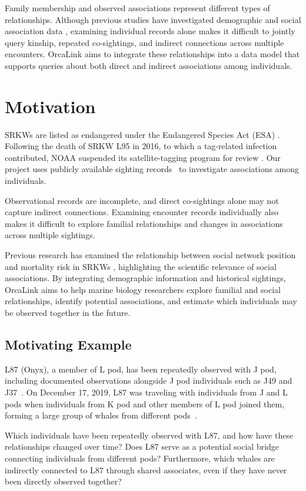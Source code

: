 \documentclass[sigconf]{acmart}
\begin{document}
Family membership and observed associations represent different types of relationships. Although previous studies have investigated demographic and social association data \cite{ellis2017}, examining individual records alone makes it difficult to jointly query kinship, repeated co-sightings, and indirect connections across multiple encounters. OrcaLink aims to integrate these relationships into a data model that supports queries about both direct and indirect associations among individuals.

\section{Motivation}

SRKWs are listed as endangered under the Endangered Species Act (ESA) \cite{epaSRKW}. Following the death of SRKW L95 in 2016, to which a tag-related infection contributed, NOAA suspended its satellite-tagging program for review \cite{noaaTagging}. Our project uses publicly available sighting records~\cite{thompson2026dryad} to investigate associations among individuals.

Observational records are incomplete, and direct co-sightings alone may not capture indirect connections. Examining encounter records individually also makes it difficult to explore familial relationships and changes in associations across multiple sightings.

Previous research has examined the relationship between social network position and mortality risk in SRKWs \cite{ellis2017}, highlighting the scientific relevance of social associations. By integrating demographic information and historical sightings, OrcaLink aims to help marine biology researchers explore familial and social relationships, identify potential associations, and estimate which individuals may be observed together in the future.

\subsection{Motivating Example}
L87 (Onyx), a member of L pod, has been repeatedly observed with J pod, including documented observations alongside J pod individuals such as J49 and J37~\cite{cwr2019mar22}. On December 17, 2019, L87 was traveling with individuals from J and L pods when individuals from K pod and other members of L pod joined them, forming a large group of whales from different pods~\cite{cwr2019dec17}.

Which individuals have been repeatedly observed with L87, and how have these relationships changed over time? Does L87 serve as a potential social bridge connecting individuals from different pods? Furthermore, which whales are indirectly connected to L87 through shared associates, even if they have never been directly observed together?
\end{document}
